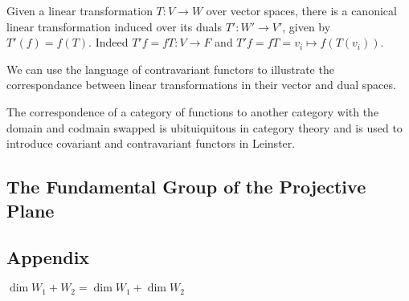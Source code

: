 \documentclass[10pt]{article}
\begin{document}
Given a linear transformation $T: V \to W$ over vector spaces, there is a
canonical linear transformation induced over its duals $T': W' \to V'$,
given by $T'(f) = f(T)$. Indeed $T'f = fT: V \to F$ and $T'f = fT = v_i \mapsto
f(T(v_i))$.

\begin{note}

We can use the language of contravariant functors to illustrate the
correspondance between linear transformations in their vector and dual spaces.


The correspondence of a category of functions to another category with the
domain and codmain swapped is ubituiquitous in category theory and is used to
introduce covariant and contravariant functors in Leinster. 


\end{note}

\subsection{The Fundamental Group of the Projective Plane}

\subsection{Appendix}

\begin{theorem}
	$\dim W_1 + W_2 = \dim W_1 + \dim W_2$
\end{theorem}
\end{document}
